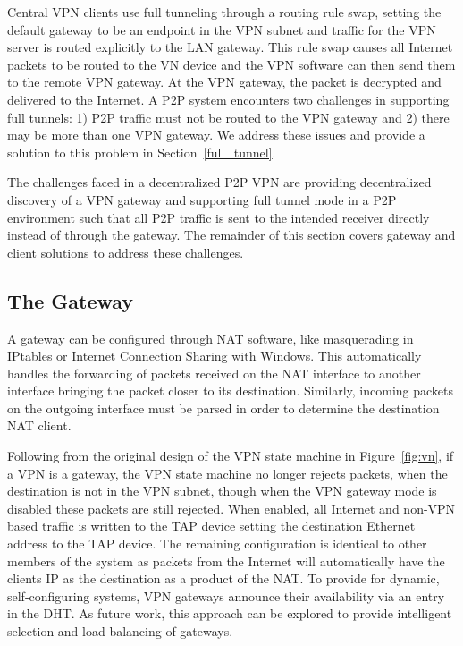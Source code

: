 Central VPN clients use full tunneling through a routing rule swap, setting
the default gateway to be an endpoint in the VPN subnet and traffic for the
VPN server is routed explicitly to the LAN gateway.  This rule swap causes
all Internet packets to be routed to the VN device and the VPN software
can then send them to the remote VPN gateway.  At the VPN gateway, the packet
is decrypted and delivered to the Internet.  A P2P system encounters two
challenges in supporting full tunnels:  1) P2P traffic must not be routed
to the VPN gateway and 2) there may be more than one VPN gateway.  We address
these issues and provide a solution to this problem in Section~\ref{full_tunnel}.

The challenges faced in a decentralized P2P VPN are providing decentralized
discovery of a VPN gateway and supporting full tunnel mode in a P2P environment
such that all P2P traffic is sent to the intended receiver directly instead of
through the gateway.  The remainder of this section covers gateway and
client solutions to address these challenges.

\subsection{The Gateway}
\label{the_gateway}
A gateway can be configured through NAT software, like masquerading in IPtables
or Internet Connection Sharing with Windows.  This automatically handles the
forwarding of packets received on the NAT interface to another interface
bringing the packet closer to its destination.  Similarly, incoming packets
on the outgoing interface must be parsed in order to determine the destination
NAT client.

Following from the original design of the VPN state machine in
Figure~\ref{fig:vn}, if a VPN is a gateway, the VPN state machine no longer
rejects packets, when the destination is not in the VPN subnet, though when the
VPN gateway mode is disabled these packets are still rejected.  When enabled,
all Internet and non-VPN based traffic is written to the TAP device setting the
destination Ethernet address to the TAP device.  The remaining configuration is
identical to other members of the system as packets from the Internet will
automatically have the clients IP as the destination as a product of the NAT.
To provide for dynamic, self-configuring systems, VPN gateways announce their
availability via an entry in the DHT.  As future work, this approach can be
explored to provide intelligent selection and load balancing of gateways.

